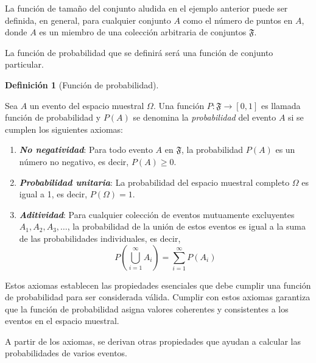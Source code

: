 \documentclass[
  us-letterpaper,
]{scrreprt}
\theoremstyle{plain}
\theoremstyle{definition}
\theoremstyle{plain}
\theoremstyle{definition}
\newtheorem{definition}{Definición}[chapter]
\theoremstyle{remark}
\begin{document}
La función de tamaño del conjunto aludida en el ejemplo anterior puede
ser definida, en general, para cualquier conjunto \(A\) como el número
de puntos en \(A\), donde \(A\) es un miembro de una colección
arbitraria de conjuntos \(\mathfrak{F}\).

La función de probabilidad que se definirá será una función de conjunto
particular.

\begin{definition}[Función de
probabilidad]\protect\hypertarget{def-fprob}{}\label{def-fprob}

Sea \(A\) un evento del espacio muestral \(\Omega\). Una función
\(P: \mathfrak{F} \to [0,1]\) es llamada función de probabilidad y
\(P(A)\) se denomina la \emph{probabilidad} del evento \(A\) si se
cumplen los siguientes axiomas:

\begin{enumerate}
\def\labelenumi{\roman{enumi}.}
\item
  \textbf{\emph{No negatividad}}: Para todo evento \(A\) en
  \(\mathfrak{F}\), la probabilidad \(P(A)\) es un número no negativo,
  es decir, \(P(A) \geq 0\).
\item
  \textbf{\emph{Probabilidad unitaria}}: La probabilidad del espacio
  muestral completo \(\Omega\) es igual a 1, es decir,
  \(P(\Omega) = 1\).
\item
  \textbf{\emph{Aditividad}}: Para cualquier colección de eventos
  mutuamente excluyentes \(A_1, A_2, A_3, \ldots\), la probabilidad de
  la unión de estos eventos es igual a la suma de las probabilidades
  individuales, es decir,
  \[P\left(\bigcup_{i=1}^\infty A_i\right) = \sum_{i=1}^\infty P(A_i)\]
\end{enumerate}

\end{definition}

Estos axiomas establecen las propiedades esenciales que debe cumplir una
función de probabilidad para ser considerada válida. Cumplir con estos
axiomas garantiza que la función de probabilidad asigna valores
coherentes y consistentes a los eventos en el espacio muestral.

A partir de los axiomas, se derivan otras propiedades que ayudan a
calcular las probabilidades de varios eventos.
\end{document}
